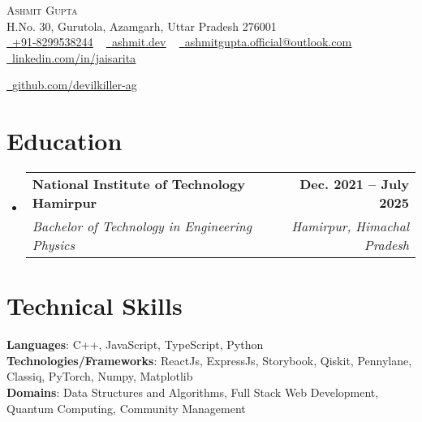 \documentclass[letterpaper,11pt]{article}
\makeatletter
\newcommand{\resumeSubheading}[4]{
    \vspace{-2pt}\item
        \begin{tabular*}{1.0\textwidth}[t]{l@{\extracolsep{\fill}}r}
            \textbf{#1} & \textbf{\small #2} \\
            \textit{\small#3} & \textit{\small #4} \\
        \end{tabular*}
        \vspace{-7pt}
}
\newcommand{\resumeSubHeadingListStart}{\begin{itemize}[leftmargin=0.0in, label={}]}
\newcommand{\resumeSubHeadingListEnd}{\end{itemize}}
\makeatother
\begin{document}
\vspace*{1pt}

\begin{center}
    {\Huge \scshape Ashmit Gupta} \\ \vspace{1pt}
    H.No. 30, Gurutola, Azamgarh, Uttar Pradesh 276001 \\ \vspace{1pt}
    \href{tel:+91-8299538244}{\raisebox{-0.2\height}\faPhone\  \underline{+91-8299538244}} ~
    \href{https://www.ashmit.dev}{\raisebox{-0.2\height}\faGlobe\ 
    \underline{ashmit.dev}} ~
    \href{mailto:ashmitgupta.official@outlook.com}{\raisebox{-0.2\height}\faEnvelope\  \underline{ashmitgupta.official@outlook.com}} ~ 
    \href{https://www.linkedin.com/in/jaisarita/}{\raisebox{-0.2\height}\faLinkedin\ \underline{linkedin.com/in/jaisarita}}  ~
    
    \href{https://github.com/devilkiller-ag}{\raisebox{-0.2\height}\faGithub\ \underline{github.com/devilkiller-ag}}
\end{center}

\section{Education}
    \resumeSubHeadingListStart
        \resumeSubheading
            {National Institute of Technology Hamirpur}{Dec. 2021 -- July 2025}
            {Bachelor of Technology in Engineering Physics}{Hamirpur, Himachal Pradesh}
    \resumeSubHeadingListEnd
    
\vspace{-8pt}

\section{Technical Skills}
    \begin{itemize}[leftmargin=0.15in, label={}]
        \small{\item{
            \textbf{Languages}{: C++, JavaScript, TypeScript, Python} \\
            \textbf{Technologies/Frameworks}{: ReactJs, ExpressJs, Storybook, Qiskit, Pennylane, Classiq, PyTorch, Numpy, Matplotlib} \\
            \textbf{Domains}{: Data Structures and Algorithms, Full Stack Web Development, Quantum Computing, Community Management}
        }}
    \end{itemize}
\end{document}
